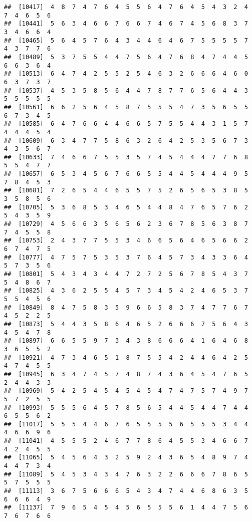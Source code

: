\documentclass[
]{book}
\begin{document}
\begin{verbatim}
##  [10417]  4  8  7  4  7  6  4  5  5  6  4  7  6  4  5  4  3  2  4  7  4  6  5  6
##  [10441]  5  6  3  4  6  6  7  6  6  7  4  6  7  4  5  6  8  3  7  3  4  6  6  4
##  [10465]  5  6  4  5  7  6  4  3  4  4  6  4  6  7  5  5  5  5  7  4  3  7  7  6
##  [10489]  5  3  7  5  5  4  4  7  5  6  4  7  6  8  4  7  4  4  5  6  6  3  6  4
##  [10513]  6  4  7  4  2  5  5  2  5  4  6  3  2  6  6  6  4  6  0  6  3  7  3  7
##  [10537]  4  5  3  5  8  5  6  4  4  7  8  7  7  6  5  6  4  4  3  5  5  5  5  5
##  [10561]  6  6  2  5  6  4  5  8  7  5  5  5  4  7  3  5  6  5  5  6  7  3  4  5
##  [10585]  6  4  7  6  6  4  4  6  6  5  7  5  5  4  4  3  1  5  7  4  4  4  5  4
##  [10609]  6  3  4  7  7  5  8  6  3  2  6  4  2  5  3  5  6  7  3  4  3  5  6  7
##  [10633]  7  4  6  6  7  5  5  3  5  7  4  5  4  4  4  7  7  6  8  5  5  4  7  7
##  [10657]  6  5  3  4  5  6  7  6  6  5  5  4  4  5  4  4  4  9  5  7  8  4  5  3
##  [10681]  7  2  6  5  4  4  6  5  5  7  5  2  6  5  6  5  3  8  5  3  5  8  5  6
##  [10705]  5  3  6  8  5  3  4  6  5  4  4  8  4  7  6  5  7  6  2  5  4  3  5  9
##  [10729]  4  5  6  6  3  5  6  5  6  2  3  6  7  8  5  6  3  8  7  7  4  5  5  8
##  [10753]  2  4  3  7  7  5  5  3  4  6  6  5  6  4  6  5  6  6  2  6  7  4  7  5
##  [10777]  4  7  5  7  5  3  5  3  7  6  4  5  7  3  4  3  3  6  4  5  7  3  5  6
##  [10801]  5  4  3  4  3  4  4  7  2  7  2  5  6  7  8  5  4  3  7  5  4  8  6  7
##  [10825]  4  3  6  2  5  5  4  5  7  3  4  5  4  2  4  6  5  3  7  5  5  4  5  6
##  [10849]  8  4  7  5  8  3  5  9  6  6  5  8  3  7  4  7  7  6  7  4  5  2  2  5
##  [10873]  5  4  4  3  5  8  6  4  6  5  2  6  6  6  7  5  6  4  3  4  5  4  7  8
##  [10897]  6  6  5  5  9  7  3  4  3  8  6  6  6  4  1  6  4  6  8  3  6  5  5  2
##  [10921]  4  7  3  4  6  5  1  8  7  5  5  4  2  4  4  6  4  2  5  4  7  4  5  5
##  [10945]  6  3  4  7  4  5  7  4  8  7  4  3  6  4  5  4  7  6  5  2  4  4  3  3
##  [10969]  5  4  2  5  4  5  4  5  4  5  4  7  4  7  5  7  4  9  7  5  7  2  5  5
##  [10993]  5  5  5  6  4  5  7  8  5  6  5  4  4  5  4  4  7  4  4  6  5  5  6  2
##  [11017]  5  5  5  4  4  6  7  6  5  5  5  5  6  5  5  5  3  4  4  4  6  6  9  6
##  [11041]  4  5  5  5  2  4  6  7  7  8  6  4  5  5  3  4  6  6  7  4  2  4  5  5
##  [11065]  5  4  5  6  4  3  2  5  9  2  4  3  6  5  4  8  9  7  4  4  4  7  3  4
##  [11089]  5  4  5  3  4  3  4  7  6  3  2  2  6  6  6  7  8  6  5  5  7  5  5  5
##  [11113]  3  6  7  5  6  6  6  5  4  3  4  7  4  4  6  8  6  3  5  6  6  6  4  9
##  [11137]  7  9  6  5  4  5  4  5  6  5  5  5  6  1  4  4  7  5  6  7  6  7  6  6

\end{verbatim}
\end{document}
